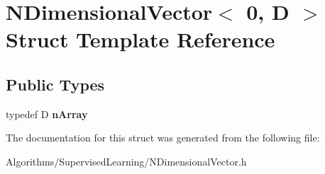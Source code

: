 \hypertarget{structNDimensionalVector_3_010_00_01D_01_4}{\section{N\+Dimensional\+Vector$<$ 0, D $>$ Struct Template Reference}
\label{structNDimensionalVector_3_010_00_01D_01_4}
}
\subsection*{Public Types}
\begin{DoxyCompactItemize}
\item 
\hypertarget{structNDimensionalVector_3_010_00_01D_01_4_a1eb07b65caa9aad2b7b20b5b8eefd54a}{typedef D {\bfseries n\+Array}}\label{structNDimensionalVector_3_010_00_01D_01_4_a1eb07b65caa9aad2b7b20b5b8eefd54a}

\end{DoxyCompactItemize}


The documentation for this struct was generated from the following file\+:\begin{DoxyCompactItemize}
\item 
Algorithms/\+Supervised\+Learning/N\+Dimensional\+Vector.\+h\end{DoxyCompactItemize}
